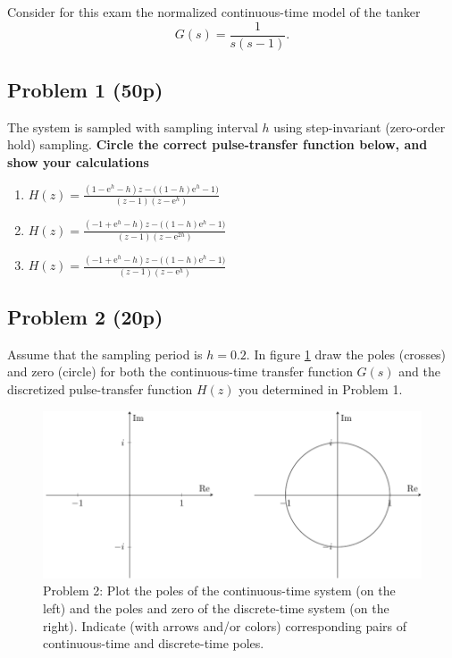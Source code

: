 \documentclass[a4paper,12pt]{article}
\newcommand{\bmpl}{\begin{minipage}[t]{140mm}}
\newcommand{\emp}{\end{minipage}}
\newcommand*{\mexp}[1]{\ensuremath{\mathrm{e}^{#1}}}
\begin{document}
Consider for this exam the normalized continuous-time model of the tanker
\[ G(s) = \frac{1}{s(s - 1)}. \]

\clearpage
\subsection*{Problem 1 (50p)}

The system is sampled with sampling interval $h$ using step-invariant (zero-order hold) sampling. \textbf{Circle the correct pulse-transfer function below, and show your calculations}
\begin{enumerate}
 \item \( H(z) = \frac{(1-\mexp{h} -h)z - \big((1-h)\mexp{h}-1\big)}{(z-1)(z-\mexp{h})}\)
 \item \( H(z) = \frac{(-1+\mexp{h} -h)z - \big((1-h)\mexp{h}-1\big)}{(z-1)(z-\mexp{2h})}\)
 \item \( H(z) = \frac{(-1+\mexp{h} -h)z - \big((1-h)\mexp{h}-1\big)}{(z-1)(z-\mexp{h})}\)
 \end{enumerate}

\noindent
\fbox{
\bmpl
{\bf Derivation:}\\
\vspace*{150mm}
\emp}

\clearpage
\subsection*{Problem 2 (20p)}
Assume that the sampling period is $h=0.2$. In figure \ref{fig:complex-plane} draw the poles (crosses) and zero (circle) for both the continuous-time transfer function $G(s)$ and the  discretized pulse-transfer function $H(z)$ you determined in Problem 1.
   \begin{figure}[h]
   \begin{center}
   \includegraphics[]{complex-plane}
   \caption{Problem 2: Plot the poles of the continuous-time system (on the left) and the poles and zero of the discrete-time system (on the right). Indicate (with arrows and/or colors) corresponding pairs of continuous-time and discrete-time poles.}
   \label{fig:complex-plane}
   \end{center}
   \end{figure}
\end{document}
